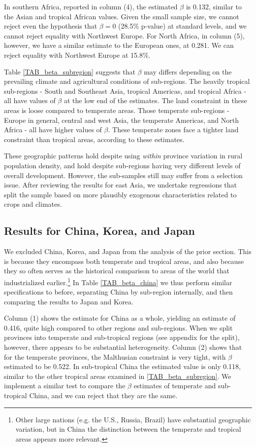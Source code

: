 \documentclass[11pt]{article}
\begin{document}
In southern Africa, reported in column (4), the estimated $\beta$ is 0.132, similar to the Asian and tropical African values. Given the small sample size, we cannot reject even the hypothesis that $\beta=0$ (28.5\% p-value) at standard levels, and we cannot reject equality with Northwest Europe. For North Africa, in column (5), however, we have a similar estimate to the European ones, at 0.281. We can reject equality with Northwest Europe at 15.8\%. 

Table \ref{TAB_beta_subregion} suggests that $\beta$ may differs depending on the prevailing climate and agricultural conditions of sub-regions. The heavily tropical sub-regions - South and Southeast Asia, tropical Americas, and tropical Africa - all have values of $\beta$ at the low end of the estimates. The land constraint in these areas is loose compared to temperate areas. Those temperate sub-regions - Europe in general, central and west Asia, the temperate Americas, and North Africa - all have higher values of $\beta$. These temperate zones face a tighter land constraint than tropical areas, according to these estimates.

These geographic patterns hold despite using \textit{within} province variation in rural population density, and hold despite sub-regions having very different levels of overall development. However, the sub-samples still may suffer from a selection issue. After reviewing the results for east Asia, we undertake regressions that split the sample based on more plausibly exogenous characteristics related to crops and climates.

\subsection{Results for China, Korea, and Japan}
We excluded China, Korea, and Japan from the analysis of the prior section. This is because they encompass both temperate and tropical areas, and also because they so often serves as the historical comparison to areas of the world that industrialized earlier.\footnote{Other large nations (e.g. the U.S., Russia, Brazil) have substantial geographic variation, but in China the distinction between the temperate and tropical areas appears more relevant.} In Table \ref{TAB_beta_china} we thus perform similar specifications to before, separating China by sub-region internally, and then comparing the results to Japan and Korea. 

Column (1) shows the estimate for China as a whole, yielding an estimate of 0.416, quite high compared to other regions and sub-regions. When we split provinces into temperate and sub-tropical regions (see appendix for the split), however, there appears to be substantial heterogeneity. Column (2) shows that for the temperate provinces, the Malthusian constraint is very tight, with $\beta$ estimated to be 0.522. In sub-tropical China the estimated value is only 0.118, similar to the other tropical areas examined in \ref{TAB_beta_subregion}. We implement a similar test to compare the $\beta$ estimates of temperate and sub-tropical China, and we can reject that they are the same.
\end{document}
